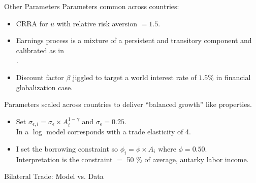 \documentclass[9pt,pdftex,aspectratio=1610]{beamer}
\theoremstyle{definition}
\begin{document}

\begin{frame}[t]{Other Parameters}
\smallskip
Parameters common across countries:
\begin{itemize}
\smallskip
\item CRRA for $u$ with relative risk aversion $= 1.5$.\\
\smallskip
\item Earnings process is a mixture of a persistent and transitory component and calibrated as in\\ \citet*{krueger2016macroeconomics}.
\smallskip
\item Discount factor $\beta$ jiggled to target a world interest rate of $1.5 \%$ in financial globalization case.
\end{itemize}
\bigskip
Parameters scaled across countries to deliver ``balanced growth'' like properties.
\begin{itemize}
\smallskip
\item Set $\sigma_{\epsilon,i} = \sigma_{\epsilon}\times A_i^{1-\gamma}$ and $\sigma_{\epsilon} = 0.25$.\\ In a $\log$ model corresponds with a trade elasticity of 4.
\medskip
\item I set the borrowing constraint so $\phi_{i} = \phi \times A_i$ where $\phi = 0.50$.\\
 Interpretation is the constraint $=$ 50 \% of average, autarky labor income.
\end{itemize}
\end{frame}


\begin{frame}[t]{Bilateral Trade: Model vs. Data}
\begin{figure}[!t]
\end{figure}
\end{frame}
\end{document}
